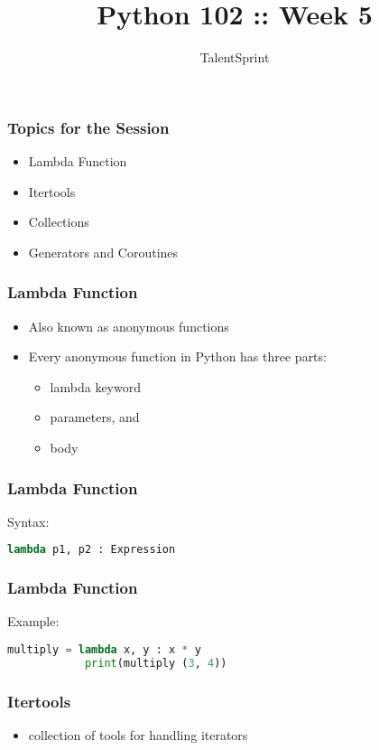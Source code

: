 \documentclass[14pt]{beamer}
\title{Python 102 :: Week 5}
\date{}
\author[TS]{TalentSprint}
\begin{document}
    \begin{frame}
        \titlepage
    \end{frame}
    \begin{frame}
        \frametitle{Topics for the Session}
        \begin{itemize}
            \item Lambda Function
            \item Itertools
            \item Collections
            \item Generators and Coroutines
        \end{itemize}
    \end{frame}
    \begin{frame}
        \frametitle{Lambda Function}
        \begin{itemize}
            \item Also known as anonymous functions
            \item Every anonymous function in Python has three parts:
                \begin{itemize}
                    \item lambda keyword
                    \item parameters, and
                    \item body
                \end{itemize}
        \end{itemize}
    \end{frame}
    \begin{frame}[containsverbatim]
        \frametitle{Lambda Function}
        \alert{Syntax:}
        \begin{lstlisting}[language=Python]
            lambda p1, p2 : Expression
        \end{lstlisting}
    \end{frame}
    \begin{frame}[containsverbatim]
        \frametitle{Lambda Function}
        \alert{Example:}
        \begin{lstlisting}[language=Python]
            multiply = lambda x, y : x * y
            print(multiply (3, 4))
        \end{lstlisting}
    \end{frame}
    \begin{frame}
        \frametitle{Itertools}
        \begin{itemize}
            \item collection of tools for handling iterators
        \end{itemize}
    \end{frame}
\end{document}

